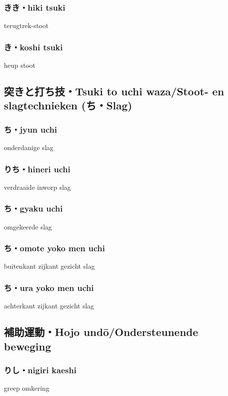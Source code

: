 \subsubsection{きき・hiki tsuki}
terugtrek-stoot

\subsubsection{き・koshi tsuki}
heup stoot

\subsection{突きと打ち技・Tsuki to uchi waza/Stoot- en slagtechnieken ({\bfseries{}ち・Slag})}
\subsubsection{ち・jyun uchi}
onderdanige slag

\subsubsection{りち・hineri uchi}
verdraaide inworp slag

\subsubsection{ち・gyaku uchi}
omgekeerde slag

\subsubsection{ち・omote yoko men uchi}
buitenkant zijkant gezicht slag

\subsubsection{ち・ura yoko men uchi}
achterkant zijkant gezicht slag

\subsection{補助運動・Hojo und\={o}/Ondersteunende beweging}
\subsubsection{りし・nigiri kaeshi}
greep omkering

